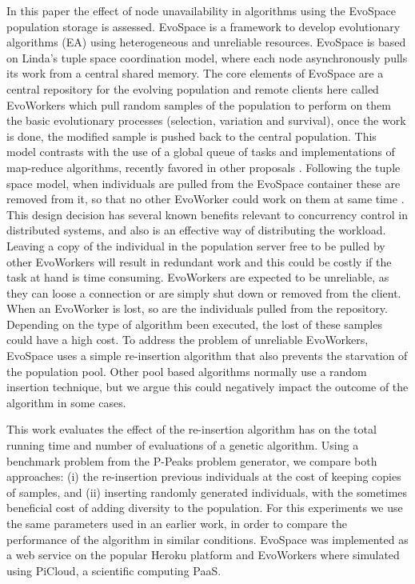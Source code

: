 \documentclass{llncs}
\begin{document}
In this paper the effect of node unavailability in algorithms using the 
EvoSpace population storage is assessed. EvoSpace \cite{Evospace,FreeLunch} is
a framework to develop evolutionary algorithms (EA) using 
heterogeneous and unreliable resources. EvoSpace is based on Linda's tuple
space \cite{Evospace} coordination model, where each node asynchronously
pulls its work from a central shared memory. The core elements of EvoSpace are a central 
repository for the evolving population and remote clients here called EvoWorkers
which pull random samples of the population to perform on them the basic evolutionary
processes (selection, variation and survival), once the work is done, the
modified sample is pushed back to the central population.
This model contrasts with  the use of a global queue of tasks and
implementations of map-reduce algorithms, recently favored in other proposals 
\cite{fazenda2012,di2013towards,FlexGP}.
Following the tuple space model, when individuals are pulled from the EvoSpace
container these are removed from it, so that no other EvoWorker could work on them at same time .
This design decision has several known benefits relevant to concurrency control 
in distributed systems, and also is an effective way of distributing the
workload. Leaving a copy of the individual in the population server free to
be pulled by other EvoWorkers will result in redundant work and this could be
costly if the task at hand is time consuming. EvoWorkers are expected to be 
unreliable, as they can loose a connection or are simply shut down or removed 
from the client. When an EvoWorker is lost, so are the individuals pulled from
the repository. Depending on the type of algorithm been executed, the lost of
these samples could have a high cost. To address the problem of unreliable 
EvoWorkers, EvoSpace uses a simple re-insertion algorithm that also 
prevents the starvation of the population pool. Other pool based algorithms
normally use a random insertion technique, but we argue this could negatively 
impact the outcome of the algorithm in some cases. 

This work evaluates the effect 
of the re-insertion algorithm has on the total running time and number of evaluations 
of a genetic algorithm. Using  a benchmark problem from the P-Peaks 
problem generator, we compare both approaches: (i) the re-insertion previous
individuals at the cost of keeping copies of samples, and (ii) inserting  
randomly generated individuals, with the sometimes beneficial cost of 
adding diversity to the population. For this experiments we use the same
parameters used in an earlier work, in order to compare the 
performance of the algorithm in similar conditions.
EvoSpace was implemented as a web service on the popular Heroku platform 
and EvoWorkers where simulated using PiCloud, a scientific computing PaaS. 
\end{document}
